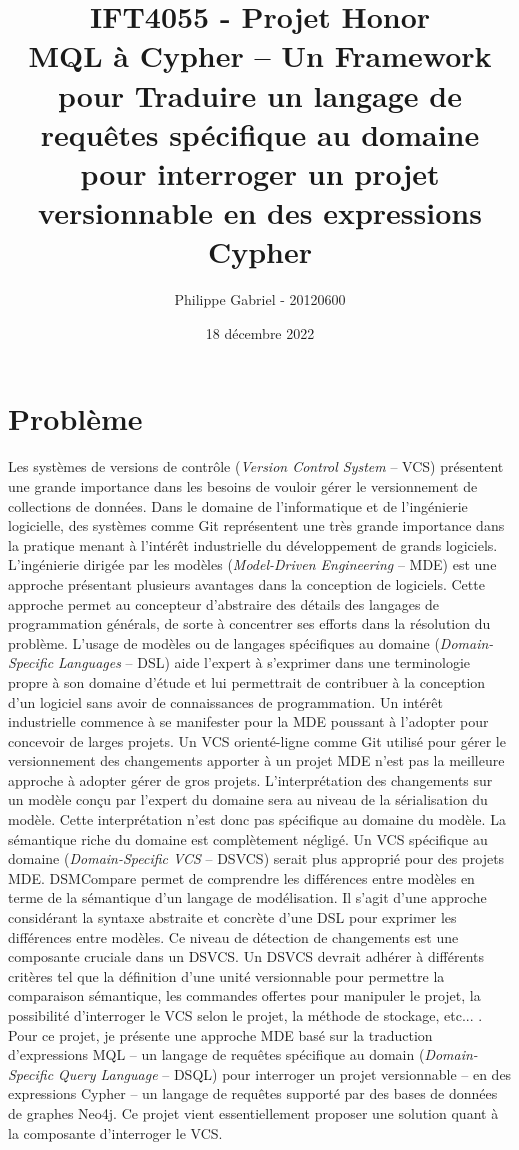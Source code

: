 \documentclass[12pt, titlepage]{article}
\title{\textbf{IFT4055 - Projet Honor} \\ MQL à Cypher -- Un Framework pour
  Traduire un langage de requêtes spécifique au domaine pour interroger un
  projet versionnable en des expressions Cypher}
\author{Philippe Gabriel - 20120600}
\date{18 décembre 2022}
\begin{document}
\maketitle
{}
\setcounter{page}{2}

\section*{Problème}

Les systèmes de versions de contrôle (\textit{Version Control System} -- VCS)
présentent une grande importance dans les besoins de vouloir gérer le
versionnement de collections de données. Dans le domaine de l'informatique et de
l'ingénierie logicielle, des systèmes comme Git représentent une très grande
importance dans la pratique menant à l'intérêt industrielle du développement de
grands logiciels. L'ingénierie dirigée par les modèles (\textit{Model-Driven
Engineering} -- MDE) est une approche présentant plusieurs avantages dans la
conception de logiciels. Cette approche permet au concepteur d'abstraire des
détails des langages de programmation générals, de sorte à concentrer ses
efforts dans la résolution du problème. L'usage de modèles ou de langages
spécifiques au domaine (\textit{Domain-Specific Languages} -- DSL) aide l'expert
à s'exprimer dans une terminologie propre à son domaine d'étude et lui
permettrait de contribuer à la conception d'un logiciel sans avoir de
connaissances de programmation. Un intérêt industrielle commence à se manifester
pour la MDE poussant à l'adopter pour concevoir de larges projets. Un VCS
orienté-ligne comme Git utilisé pour gérer le versionnement des changements
apporter à un projet MDE n'est pas la meilleure approche à adopter gérer de gros
projets. L'interprétation des changements sur un modèle conçu par l'expert du
domaine sera au niveau de la sérialisation du modèle. Cette interprétation n'est
donc pas spécifique au domaine du modèle. La sémantique riche du domaine est
complètement négligé. Un VCS spécifique au domaine (\textit{Domain-Specific VCS}
-- DSVCS) serait plus approprié pour des projets MDE. DSMCompare
\cite{dsmcompare} permet de comprendre les différences entre modèles en terme de
la sémantique d'un langage de modélisation. Il s'agit d'une approche considérant
la syntaxe abstraite et concrète d'une DSL pour exprimer les différences entre
modèles. Ce niveau de détection de changements est une composante cruciale dans
un DSVCS. Un DSVCS devrait adhérer à différents critères tel que la définition
d'une unité versionnable pour permettre la comparaison sémantique, les commandes
offertes pour manipuler le projet, la possibilité d'interroger le VCS selon le
projet, la méthode de stockage, etc... \cite{dsvcs}. Pour ce projet, je présente
une approche MDE basé sur la traduction d'expressions MQL -- un langage de
requêtes spécifique au domain (\textit{Domain-Specific Query Language} -- DSQL)
pour interroger un projet versionnable -- en des expressions Cypher -- un
langage de requêtes supporté par des bases de données de graphes Neo4j. Ce
projet vient essentiellement proposer une solution quant à la composante
d'interroger le VCS.
\end{document}
